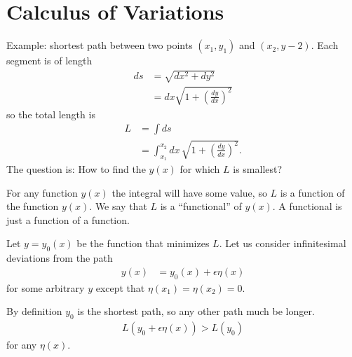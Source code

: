 \section{Calculus of Variations}
Example: shortest path between two points
$(x_1, y_1)$ and $(x_2, y-2)$.
Each segment is of length
\begin{align}
    ds &= \sqrt{dx^2 + dy^2}\\
    &= dx \sqrt{1 + {\left( \frac{dy}{dx} \right)}^2}
\end{align}
so the total length is
\begin{align}
    L &=
    \int ds\\
    &=
    \int_{x_1}^{x_2} dx\,
    \sqrt{1 + {\left( \frac{dy}{dx} \right)}^2}.
\end{align}
The question is:
How to find the $y(x)$ for which $L$ is smallest?


For any function $y(x)$ the integral will have some value,
so $L$ is a function of the function $y(x)$.
We say that $L$ is a ``functional'' of $y(x)$.
A functional is just a function of a function.

Let $y=y_0(x)$ be the function that minimizes $L$.
Let us consider infinitesimal deviations from the path
\begin{align}
    y(x) &= y_0(x) + \epsilon \eta(x)
\end{align}
for some arbitrary $y$ except that
$\eta(x_1) = \eta(x_2) = 0$.

By definition $y_0$ is the shortest path,
so any other path much be longer.
\begin{align}
    L\left( y_0 + \epsilon\eta(x) \right) > L(y_0)
\end{align}
for any $\eta(x)$.


